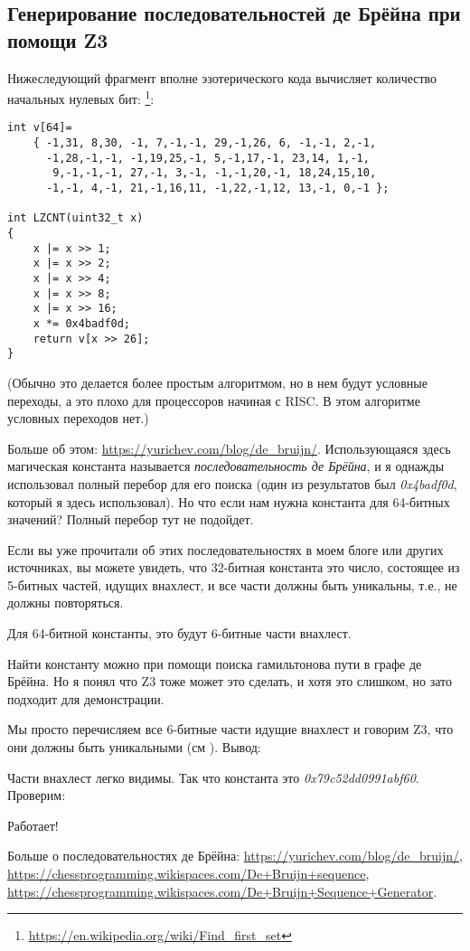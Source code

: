 \subsection{Генерирование последовательностей де Брёйна при помощи Z3}

Нижеследующий фрагмент вполне эзотерического кода вычисляет количество начальных нулевых бит:
\footnote{\url{https://en.wikipedia.org/wiki/Find_first_set}}:

\begin{lstlisting}
int v[64]=
	{ -1,31, 8,30, -1, 7,-1,-1, 29,-1,26, 6, -1,-1, 2,-1,
	  -1,28,-1,-1, -1,19,25,-1, 5,-1,17,-1, 23,14, 1,-1,
	   9,-1,-1,-1, 27,-1, 3,-1, -1,-1,20,-1, 18,24,15,10,
	  -1,-1, 4,-1, 21,-1,16,11, -1,22,-1,12, 13,-1, 0,-1 };

int LZCNT(uint32_t x)
{
    x |= x >> 1;
    x |= x >> 2;
    x |= x >> 4;
    x |= x >> 8;
    x |= x >> 16;
    x *= 0x4badf0d;
    return v[x >> 26];
}
\end{lstlisting}

(Обычно это делается более простым алгоритмом, но в нем будут условные переходы,
а это плохо для процессоров начиная с RISC. В этом алгоритме условных переходов нет.)

Больше об этом: \url{https://yurichev.com/blog/de_bruijn/}.
Использующаяся здесь магическая константа называется \textit{последовательность де Брёйна},
и я однажды использовал полный перебор для его поиска (один из результатов был \textit{0x4badf0d},
который я здесь использовал).
Но что если нам нужна константа для 64-битных значений?
Полный перебор тут не подойдет.

Если вы уже прочитали об этих последовательностях в моем блоге или других источниках,
вы можете увидеть, что 32-битная константа это число, состоящее из 5-битных частей, идущих внахлест,
и все части должны быть уникальны, т.е., не должны повторяться.

Для 64-битной константы, это будут 6-битные части внахлест.

Найти константу можно при помощи поиска гамильтонова пути в графе де Брёйна.
Но я понял что Z3 тоже может это сделать, и хотя это слишком, но зато подходит для демонстрации.



Мы просто перечисляем все 6-битные части идущие внахлест и говорим Z3, что они должны быть уникальными (см ).
Вывод:



Части внахлест легко видимы.
Так что константа это \textit{0x79c52dd0991abf60}.
Проверим:



Работает!

Больше о последовательностях де Брёйна:
\url{https://yurichev.com/blog/de_bruijn/},
\url{https://chessprogramming.wikispaces.com/De+Bruijn+sequence},
\url{https://chessprogramming.wikispaces.com/De+Bruijn+Sequence+Generator}.

